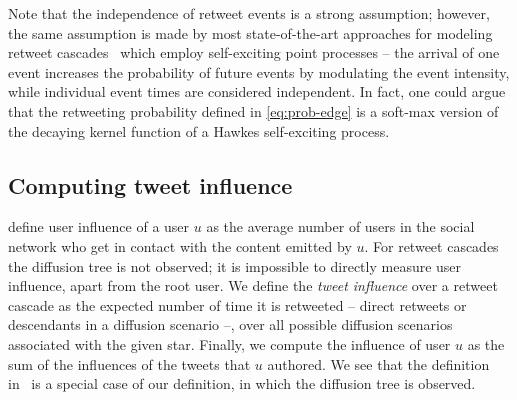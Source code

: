 Note that the independence of retweet events is a strong assumption; however, the same assumption is made by most state-of-the-art approaches for modeling retweet cascades~\cite{Mishra2016,Zhao2015} which employ self-exciting point processes -- the arrival of one event increases the probability of future events by modulating the event intensity, while individual event times are considered independent.
In fact, one could argue that the retweeting probability defined in \cref{eq:prob-edge} is a soft-max version of the decaying kernel function of a Hawkes self-exciting process.



\subsection{Computing tweet influence}
\label{subsec:user-influence}

\citet{Du2013} define user influence of a user $u$ as the average number of users in the social network who get in contact with the content emitted by $u$.
For retweet cascades the diffusion tree is not observed; it is impossible to directly measure user influence, apart from the root user.
We define the \emph{tweet influence} over a retweet cascade as the expected number of time it is retweeted -- direct retweets or descendants in a diffusion scenario --, over all possible diffusion scenarios associated with the given star.
Finally, we compute the influence of user $u$ as the sum of the influences of the tweets that $u$ authored.
We see that the definition in~\cite{Du2013} is a special case of our definition, in which the diffusion tree is observed.

